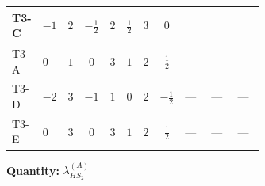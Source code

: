 \documentclass[8pt]{article}
\begin{document}
\begin{landscape}
\begin{longtable}{@{}llcccccc >{\raggedright\arraybackslash}p{0.21\linewidth} >{\raggedright\arraybackslash}p{0.21\linewidth} >{\raggedright\arraybackslash}p{0.21\linewidth}@{}}
\midrule
T3-C & $-1$ & $2$ & $-\frac{1}{2}$ & $2$ & $\frac{1}{2}$ & $3$ & $0$ & \scriptsize\adjustbox{max width=\linewidth}{$\begin{gathered} {\lambda_{HS_2}^{(A)}} (6 \operatorname{Tr}\!\left({Y_d}\,\left({Y_d}\right)^{\dagger}\right)+2 \operatorname{Tr}\!\left({Y_e}\,\left({Y_e}\right)^{\dagger}\right)+6 \operatorname{Tr}\!\left({Y_u}\,\left({Y_u}\right)^{\dagger}\right))\end{gathered}$} & \scriptsize\adjustbox{max width=\linewidth}{$\begin{gathered} -4 {\lambda_{10}} \left({\lambda_{H H^\dagger S_1^\dagger S_2^\dagger}^{\rm Cross}}\right)^{*}\end{gathered}$} & \scriptsize\adjustbox{max width=\linewidth}{$\begin{gathered} -4 {\lambda_{H H^\dagger S_1^\dagger S_2^\dagger}^{\rm Cross}} (2 \left({\lambda_{H H^\dagger S_1^\dagger S_2^\dagger}^{\rm Cross}}\right)^{*}+\left({\lambda_{10}}\right)^{*})\end{gathered}$} \\
\midrule
T3-A & $0$ & $1$ & $0$ & $3$ & $1$ & $2$ & $\frac{1}{2}$ & --- & --- & --- \\
\midrule
T3-D & $-2$ & $3$ & $-1$ & $1$ & $0$ & $2$ & $-\frac{1}{2}$ & --- & --- & --- \\
\midrule
T3-E & $0$ & $3$ & $0$ & $3$ & $1$ & $2$ & $\frac{1}{2}$ & --- & --- & --- \\
\midrule
\bottomrule
\end{longtable}
\clearpage
\noindent\textbf{Quantity: }$\lambda_{HS_2}^{(A)}$\par\smallskip

\end{landscape}
\end{document}

